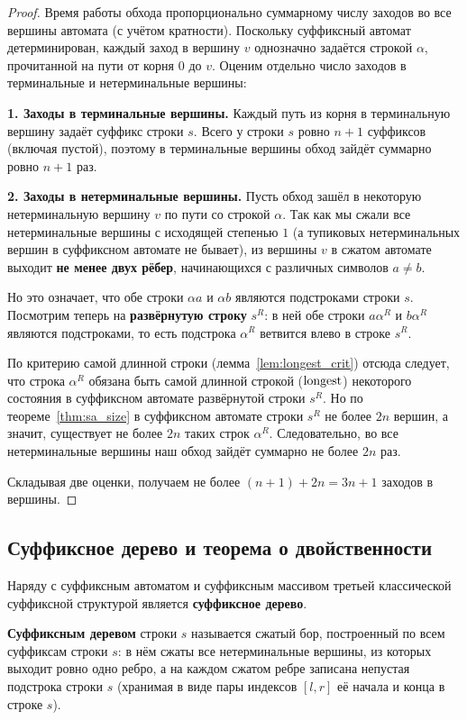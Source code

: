\begin{proof}
    Время работы обхода пропорционально суммарному числу заходов во все вершины автомата (с учётом кратности). Поскольку суффиксный автомат детерминирован, каждый заход в вершину $v$ однозначно задаётся строкой $\alpha$, прочитанной на пути от корня $0$ до $v$. Оценим отдельно число заходов в терминальные и нетерминальные вершины:

    \textbf{1. Заходы в терминальные вершины.} Каждый путь из корня в терминальную вершину задаёт суффикс строки $s$. Всего у строки $s$ ровно $n + 1$ суффиксов (включая пустой), поэтому в терминальные вершины обход зайдёт суммарно ровно $n + 1$ раз.

    \textbf{2. Заходы в нетерминальные вершины.} Пусть обход зашёл в некоторую нетерминальную вершину $v$ по пути со строкой $\alpha$. Так как мы сжали все нетерминальные вершины с исходящей степенью $1$ (а тупиковых нетерминальных вершин в суффиксном автомате не бывает), из вершины $v$ в сжатом автомате выходит \textbf{не менее двух рёбер}, начинающихся с различных символов $a \ne b$.

    Но это означает, что обе строки $\alpha a$ и $\alpha b$ являются подстроками строки $s$. Посмотрим теперь на \textbf{развёрнутую строку} $s^R$: в ней обе строки $a\alpha^R$ и $b\alpha^R$ являются подстроками, то есть подстрока $\alpha^R$ ветвится влево в строке $s^R$.

    По критерию самой длинной строки (лемма~\ref{lem:longest_crit}) отсюда следует, что строка $\alpha^R$ обязана быть самой длинной строкой ($\operatorname{longest}$) некоторого состояния в суффиксном автомате развёрнутой строки $s^R$. Но по теореме~\ref{thm:sa_size} в суффиксном автомате строки $s^R$ не более $2n$ вершин, а значит, существует не более $2n$ таких строк $\alpha^R$. Следовательно, во все нетерминальные вершины наш обход зайдёт суммарно не более $2n$ раз.

    Складывая две оценки, получаем не более $(n + 1) + 2n = 3n + 1$ заходов в вершины.
\end{proof}

\subsection{Суффиксное дерево и теорема о двойственности}

Наряду с суффиксным автоматом и суффиксным массивом третьей классической суффиксной структурой является \textbf{суффиксное дерево}.

\begin{definition}
    \textbf{Суффиксным деревом} строки $s$ называется сжатый бор, построенный по всем суффиксам строки $s$: в нём сжаты все нетерминальные вершины, из которых выходит ровно одно ребро, а на каждом сжатом ребре записана непустая подстрока строки $s$ (хранимая в виде пары индексов $[l, r]$ её начала и конца в строке $s$).
\end{definition}

